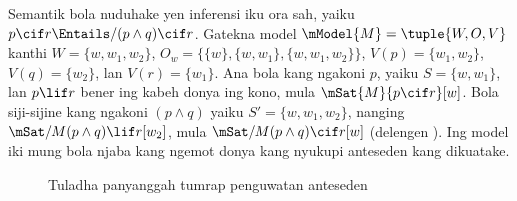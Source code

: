 \documentclass[../../../include/open-logic-section]{subfiles}
\begin{document}
\begin{ex}
  Semantik bola nuduhake yen inferensi iku ora sah, yaiku $p
  \cif r \Entails/ (p \land q) \cif r$. Gatekna model
  $\mModel{M} = \tuple{W, O, V}$ kanthi $W = \{w, w_1, w_2\}$,
  $O_w = \{\{w\}, \{w, w_1\}, \{w, w_1, w_2\}\}$,
  $V(p) = \{w_1, w_2\}$, $V(q) = \{w_2\}$, lan $V(r) = \{w_1\}$.
  Ana bola kang ngakoni $p$, yaiku $S = \{w, w_1\}$, lan
  $p \lif r$ bener ing kabeh donya ing kono, mula
  $\mSat{M}{p \cif r}[w]$. Bola siji-sijine kang ngakoni
  $(p \land q)$ yaiku $S' = \{w, w_1, w_2\}$, nanging
  $\mSat/{M}{(p \land q) \lif r}[w_2]$, mula
  $\mSat/{M}{(p \land q) \cif r}[w]$
  (delengen ).
Ing model iki mung bola njaba kang ngemot donya kang nyukupi anteseden kang dikuatake.

\begin{figure}
\begin{center}
\caption{Tuladha panyanggah tumrap penguwatan anteseden}
\end{center}
\end{figure}
\end{ex}
\end{document}
